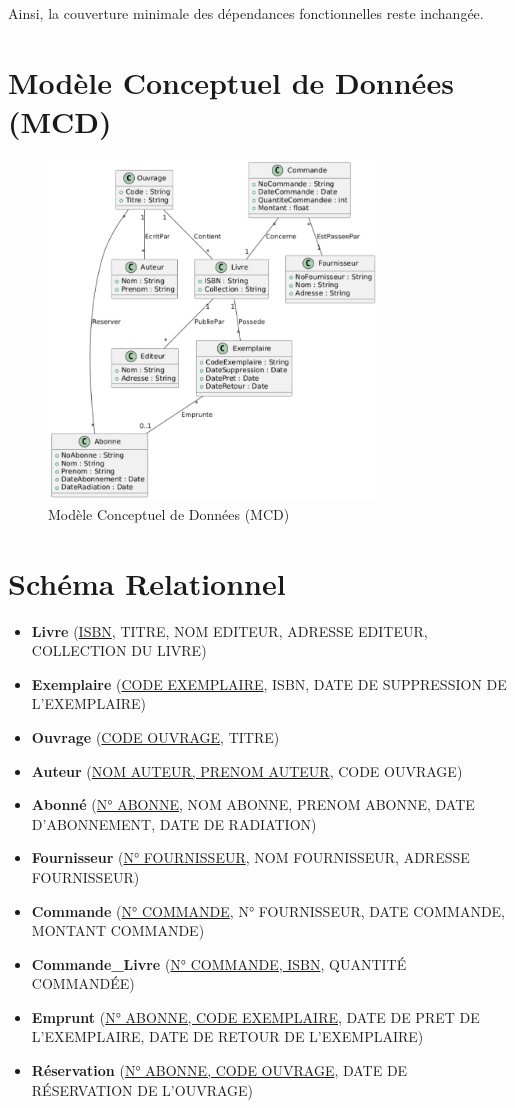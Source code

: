 \documentclass[a4paper,11pt]{article}
\begin{document}
Ainsi, la couverture minimale des dépendances fonctionnelles reste inchangée.

\section{Modèle Conceptuel de Données (MCD)}
\begin{figure}[H] 
    \centering
    \includegraphics[width=0.8\textwidth]{image.png}
    \caption{Modèle Conceptuel de Données (MCD)}
    \label{fig:mcd}
\end{figure}

\section{Schéma Relationnel}
\begin{itemize}
    \item \textbf{Livre} (\underline{ISBN}, TITRE, NOM EDITEUR, ADRESSE EDITEUR, COLLECTION DU LIVRE)
    \item \textbf{Exemplaire} (\underline{CODE EXEMPLAIRE}, ISBN, DATE DE SUPPRESSION DE L’EXEMPLAIRE)
    \item \textbf{Ouvrage} (\underline{CODE OUVRAGE}, TITRE)
    \item \textbf{Auteur} (\underline{NOM AUTEUR, PRENOM AUTEUR}, CODE OUVRAGE)
    \item \textbf{Abonné} (\underline{N° ABONNE}, NOM ABONNE, PRENOM ABONNE, DATE D'ABONNEMENT, DATE DE RADIATION)
    \item \textbf{Fournisseur} (\underline{N° FOURNISSEUR}, NOM FOURNISSEUR, ADRESSE FOURNISSEUR)
    \item \textbf{Commande} (\underline{N° COMMANDE}, N° FOURNISSEUR, DATE COMMANDE, MONTANT COMMANDE)
    \item \textbf{Commande\_Livre} (\underline{N° COMMANDE, ISBN}, QUANTITÉ COMMANDÉE)
    \item \textbf{Emprunt} (\underline{N° ABONNE, CODE EXEMPLAIRE}, DATE DE PRET DE L’EXEMPLAIRE, DATE DE RETOUR DE L’EXEMPLAIRE)
    \item \textbf{Réservation} (\underline{N° ABONNE, CODE OUVRAGE}, DATE DE RÉSERVATION DE L'OUVRAGE)
\end{itemize}
\end{document}
